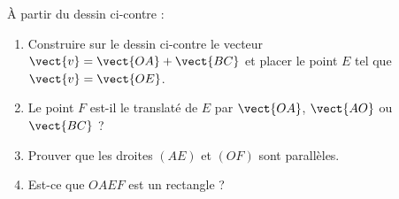 
\begin{exercice}[\ldots/4]\label{exosmath-0676}

\begin{wrapfigure}{r}{8.0cm}
   \vspace{-0.5cm}        %
   \centering                                                                                                                               
                                                                                                                
\end{wrapfigure}

À partir du dessin ci-contre :
    \begin{enumerate}
        \item
            Construire sur le dessin ci-contre le vecteur \( \vect{ v }=\vect{ OA }+\vect{ BC }\) et placer le point \( E\) tel que \( \vect{ v }=\vect{ OE }\).
        \item
            Le point \( F\) est-il le translaté de \( E\) par \( \vect{ OA }\), \( \vect{ AO }\) ou \( \vect{ BC }\) ?
        \item
            Prouver que les droites \( (AE)\) et \( (OF)\) sont parallèles.
        \item
            Est-ce que \( OAEF\) est un rectangle ?
    \end{enumerate}

\end{exercice}
